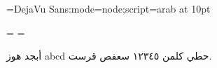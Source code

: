 
\font\aaa={DejaVu Sans:mode=node;script=arab} at 10pt\aaa

\showboxdepth=\maxdimen
\showboxbreadth=\maxdimen



أبجد هوز abcd حطي كلمن ١٢٣٤٥ سعفص قرست.
\bye
